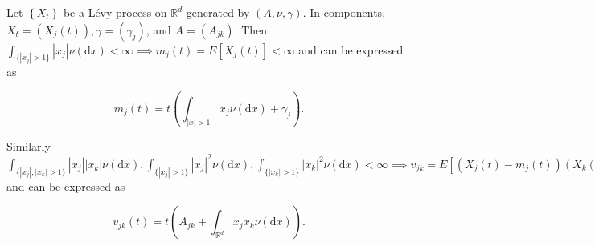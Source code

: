 \documentclass[a4paper,11pt]{article}
\begin{document}
\begin{lemma}
    Let $\left\{X_{t}\right\}$ be a Lévy process on $\mathbb{R}^{d}$ generated
    by $(A, \nu, \gamma )$. In components, $X_{t}=\left(X_{j}(t)\right), \gamma=\left(\gamma_{j}\right)$,
    and $A=\left(A_{j k}\right)$.
    Then $\int_{\{|x_{j}| >1\}} |x_{j}| \nu(\mathrm{d} x)<\infty \implies m_{j}(t)=E\left[X_{j}(t)\right]< \infty$ and can be expressed as

    \begin{equation}
        m_{j}(t)=t\left(\int_{|x|>1} x_{j} \nu(\mathrm{d} x)+\gamma_{j}\right).
    \end{equation}

    Similarly $\int_{\{|x_{j}|,|x_{k}|  >1\}} |x_{j}||x_{k}| \nu(\mathrm{d} x),\int_{\{|x_{j}| >1\}} |x_{j}|^{2} \nu(\mathrm{d} x),\int_{\{|x_{k}| >1\}} |x_{k}|^{2} \nu(\mathrm{d} x)<\infty  \implies v_{jk}=E\left[\left(X_{j}(t)-m_{j}(t)\right)\left(X_{k}(t)-m_{k}(t)\right)\right], v_{j j}, v_{k k}< \infty $
    and can be expressed as

    \begin{equation}
        v_{j k}(t)=t\left(A_{j k}+\int_{\mathbb{R}^{d}} x_{j} x_{k} \nu(\mathrm{d} x)\right).
    \end{equation}



\end{lemma}
\end{document}
